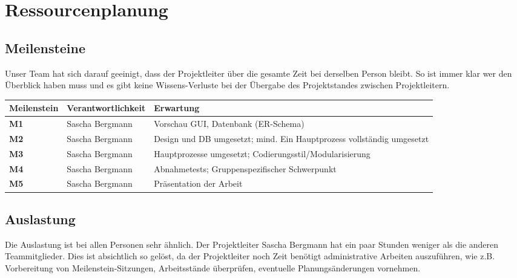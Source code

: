 \section{Ressourcenplanung}
\subsection{Meilensteine}
Unser Team hat sich darauf geeinigt, dass der Projektleiter über die gesamte Zeit bei derselben Person bleibt.
So ist immer klar wer den Überblick haben muss und es gibt keine Wissens-Verluste bei der Übergabe des Projektstandes zwischen Projektleitern. 

\begin{tabularx}{\textwidth-2cm}{|l|l|X|} \hline
\textbf{Meilenstein}	& \textbf{Verantwortlichkeit} &	\textbf{Erwartung} \\ \hline
\textbf{M1}	&Sascha Bergmann	&Vorschau GUI, Datenbank (ER-Schema) \\  \hline
\textbf{M2}	&Sascha Bergmann	&Design und DB umgesetzt; mind. Ein Hauptprozess vollständig umgesetzt \\ \hline
\textbf{M3}	&Sascha Bergmann	&Hauptprozesse umgesetzt; Codierungsstil/Modularisierung \\ \hline
\textbf{M4}	&Sascha Bergmann	&Abnahmetests; Gruppenspezifischer Schwerpunkt \\ \hline
\textbf{M5}	&Sascha Bergmann	&Präsentation der Arbeit \\ \hline
\end{tabularx}

\iffalse
  \begin{ganttchart}{1}{12}
    \gantttitle{Projektplan}{12} \\
    \gantttitlelist{1,...,12}{1} \\
    \ganttmilestone{Meilenstein M1}{4}  \ganttnewline
    \ganttmilestone{Meilenstein M2}{5}  \ganttnewline
    \ganttmilestone{Meilenstein M3}{6}  \ganttnewline
    \ganttmilestone{Meilenstein M4}{7} 
  \end{ganttchart}
\fi

\subsection{Auslastung}
Die Auslastung ist bei allen Personen sehr ähnlich. Der Projektleiter Sascha Bergmann hat ein paar Stunden weniger als die anderen Teammitglieder. Dies ist absichtlich so gelöst, da der Projektleiter noch Zeit benötigt administrative Arbeiten auszuführen, wie z.B. Vorbereitung von Meilenstein-Sitzungen, Arbeitsstände überprüfen, eventuelle Planungsänderungen vornehmen.

